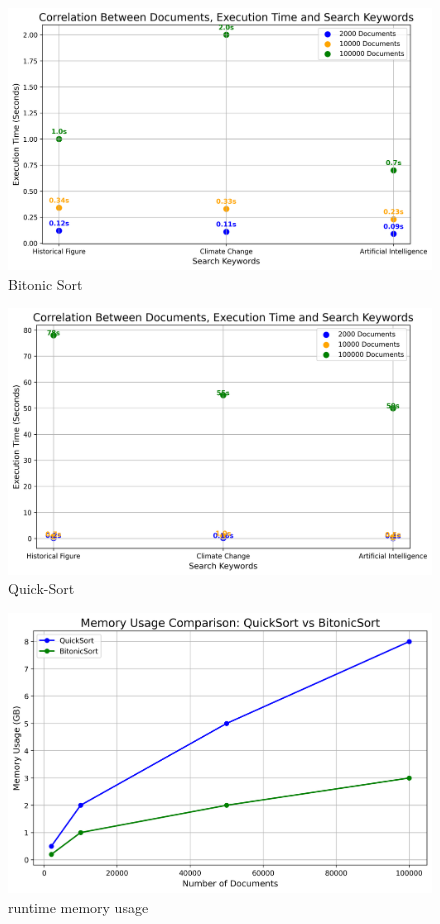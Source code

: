     \begin{figure}[h!]
        \centering
        \includegraphics[width=\textwidth]{btsort.png}
        \caption{Bitonic Sort}
        \label{fig:btsort}
    \end{figure}
    \begin{figure}[h!]
        \centering
        \includegraphics[width=\textwidth]{quicksort.png}
        \caption{Quick-Sort}
        \label{fig:btsort}
    \end{figure}
    \begin{figure}[h!]
        \centering
        \includegraphics[width=\textwidth]{memory-diff.png}
        \caption{runtime memory usage}
        \label{fig:btsort}
    \end{figure}
    \clearpage
